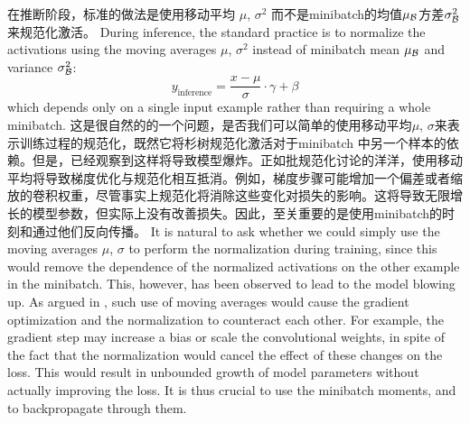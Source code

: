 在推断阶段，标准的做法是使用移动平均 $\mu$, $\sigma^2$ 而不是minibatch的均值$\mu_{\mathcal{B}}$方差$\sigma_{\mathcal{B}}^2$来规范化激活。
During inference, the standard practice is to normalize the activations using the moving averages $\mu$, $\sigma^2$ instead of minibatch mean $\mu_{\mathcal{B}}$ and variance $\sigma_{\mathcal{B}}^2$:
$$
y_\text{inference} = \frac{x-\mu}{\sigma}\cdot \gamma + \beta
$$
which depends only on a single input example rather than requiring a whole minibatch.
这是很自然的的一个问题，是否我们可以简单的使用移动平均$\mu$, $\sigma$来表示训练过程的规范化，既然它将杉树规范化激活对于minibatch 中另一个样本的依赖。但是，已经观察到这样将导致模型爆炸。正如批规范化讨论的洋洋，使用移动平均将导致梯度优化与规范化相互抵消。例如，梯度步骤可能增加一个偏差或者缩放的卷积权重，尽管事实上规范化将消除这些变化对损失的影响。这将导致无限增长的模型参数，但实际上没有改善损失。因此，至关重要的是使用minibatch的时刻和通过他们反向传播。
It is natural to ask whether we could simply use the moving averages $\mu$, $\sigma$ to perform the normalization during training, since this would remove the dependence of the normalized activations on the other example in the minibatch. This, however, has been observed to lead to the model blowing up. As argued in \cite{batchnorm}, such use of moving averages would cause the gradient optimization and the normalization to counteract each other. For example, the gradient step may increase a bias or scale the convolutional weights, in spite of the fact that the normalization would cancel the effect of these changes on the loss. This would result in unbounded growth of model parameters without actually improving the loss. It is thus crucial to use the minibatch moments, and to backpropagate through them.

